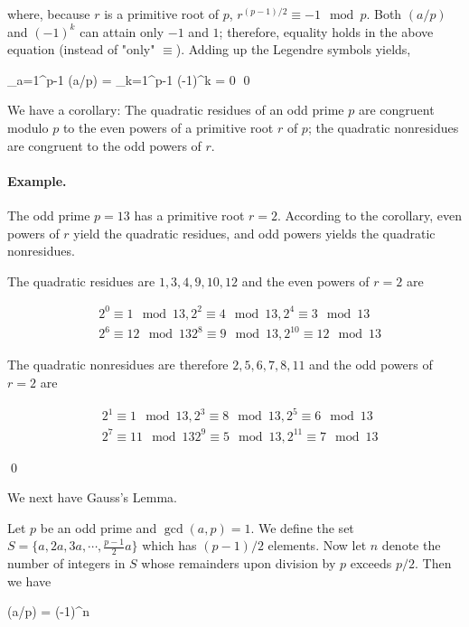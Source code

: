 where, because $r$ is a primitive root of $p$, $r^{(p-1)/2} \equiv -1 \mod p$. Both $(a/p)$ and $(-1)^k$ can attain only $-1$ and $1$; therefore, equality holds in the above equation (instead of "only" $\equiv$). Adding up the Legendre symbols yields,

\bee
\sum_{a=1}^{p-1} (a/p) = \sum_{k=1}^{p-1} (-1)^k = 0 \qed
\eee

We have a corollary: The quadratic residues of an odd prime $p$ are congruent modulo $p$ to the even powers of a primitive root $r$ of $p$; the quadratic nonresidues are congruent to the odd powers of $r$.

\paragraph{Example.} The odd prime $p=13$ has a primitive root $r=2$. According to the corollary, even powers of $r$ yield the quadratic residues, and odd powers yields the quadratic nonresidues.

The quadratic residues are $1, 3, 4, 9, 10, 12$ and the even powers of $r=2$ are

\begin{align*}
& 2^0 \equiv 1 \mod 13, 2^2 \equiv 4 \mod 13, 2^4 \equiv 3 \mod 13 \\
& 2^6 \equiv 12 \mod 13 2^8 \equiv 9 \mod 13, 2^{10} \equiv 12 \mod 13
\end{align*}

The quadratic nonresidues are therefore $2, 5, 6, 7, 8, 11$ and the odd powers of $r=2$ are

\begin{align*}
& 2^1 \equiv 1 \mod 13, 2^3 \equiv 8 \mod 13, 2^5 \equiv 6 \mod 13 \\
& 2^7 \equiv 11 \mod 13 2^9 \equiv 5 \mod 13, 2^{11} \equiv 7 \mod 13
\end{align*}

\qed

We next have Gauss's Lemma.

\begin{theorem}
	\label{2023-02-13:th4}
Let $p$ be an odd prime and $\gcd(a,p)=1$. We define the set $S = \{a, 2a, 3a, \cdots, \frac{p-1}{2}a \}$ which has $(p-1)/2$ elements. Now let $n$ denote the number of integers in $S$ whose remainders upon division by $p$ exceeds $p/2$. Then we have

\bee
(a/p) = (-1)^n
\eee

\end{theorem}

